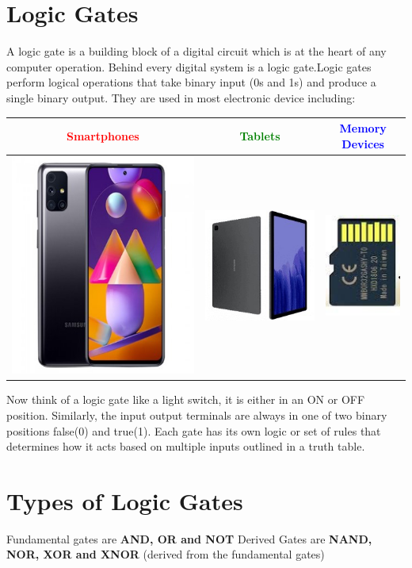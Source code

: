\documentclass{article}
\begin{document}
		\section{Logic Gates}
			A logic gate is a building block of a digital circuit which is at the heart of any computer operation. Behind every digital system is a logic gate.Logic gates perform logical operations that take binary input (0s and 1s) and produce  a single binary output. They are used in most electronic device including:
				\begin{table}[h!]
					\begin{center}
						\label{tab: table 1}
						\begin{tabular}{c c c}
							\hline
							\textcolor{red}{Smartphones} & \textcolor{green}{Tablets} & \textcolor{blue}{Memory Devices}\\
							\hline
							\includegraphics[width=0.1\linewidth]{pictures/phone.jpg} & \includegraphics[width=0.1\linewidth]{pictures/tablet.jpg} & \includegraphics[width=0.1\linewidth]{pictures/memory device.jpg}\\
							\hline
						\end{tabular}
					\end{center}	
				\end{table}
		\newline
			Now think of a logic gate like a light switch, it is either in an ON or OFF position. Similarly, the input output terminals are always in one of two binary positions false(0) and true(1). Each gate has its own logic or set of rules that determines how it acts based on multiple inputs outlined in a truth table.
		\newpage	
		\section{Types of Logic Gates}
			Fundamental gates are \textbf{AND, OR and NOT}
			Derived Gates are \textbf{NAND, NOR, XOR and XNOR} (derived from the fundamental gates)
			
\end{document}
